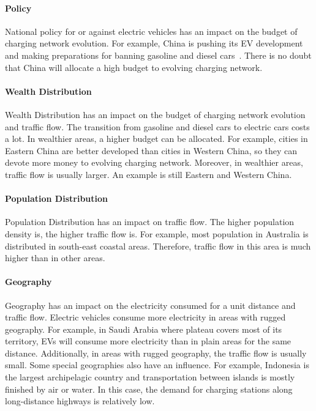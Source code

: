 \documentclass{mcmthesis}
\begin{document}
\paragraph{Policy}
National policy for or against electric vehicles has an impact on the budget of charging network evolution. For example, China is pushing its EV development and making preparations for banning gasoline and diesel cars~\cite{ChinaBan}. There is no doubt that China will allocate a high budget to evolving charging network.

\paragraph{Wealth Distribution}
Wealth Distribution has an impact on the budget of charging network evolution and traffic flow. The transition from gasoline and diesel cars to electric cars costs a lot. In wealthier areas, a higher budget can be allocated. For example, cities in Eastern China are better developed than cities in Western China, so they can devote more money to evolving charging network. Moreover, in wealthier areas, traffic flow is usually larger. An example is still Eastern and Western China.

\paragraph{Population Distribution}
Population Distribution has an impact on traffic flow. The higher population density is, the higher traffic flow is. For example, most population in Australia is distributed in south-east coastal areas. Therefore, traffic flow in this area is much higher than in other areas.

\paragraph{Geography}
Geography has an impact on the electricity consumed for a unit distance and traffic flow. Electric vehicles consume more electricity in areas with rugged geography. For example, in Saudi Arabia where plateau covers most of its territory, EVs will consume more electricity than in plain areas for the same distance. Additionally, in areas with rugged geography, the traffic flow is usually small. Some special geographies also have an influence. For example, Indonesia is the largest archipelagic country and transportation between islands is mostly finished by air or water. In this case, the demand for charging stations along long-distance highways is relatively low.
\end{document}
